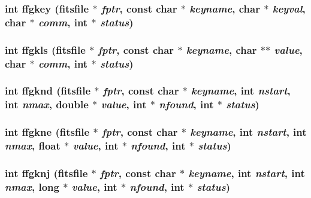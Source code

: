 \subsubsection{\setlength{\rightskip}{0pt plus 5cm}int ffgkey (\bf{fitsfile} $\ast$ {\em fptr}, const char $\ast$ {\em keyname}, char $\ast$ {\em keyval}, char $\ast$ {\em comm}, int $\ast$ {\em status})}\label{fitsio__64_8h_9a92da40129953d96be3d75a06ee8b8a}


\subsubsection{\setlength{\rightskip}{0pt plus 5cm}int ffgkls (\bf{fitsfile} $\ast$ {\em fptr}, const char $\ast$ {\em keyname}, char $\ast$$\ast$ {\em value}, char $\ast$ {\em comm}, int $\ast$ {\em status})}\label{fitsio__64_8h_ffb87d66b7458265f69a1989575b4c0c}


\subsubsection{\setlength{\rightskip}{0pt plus 5cm}int ffgknd (\bf{fitsfile} $\ast$ {\em fptr}, const char $\ast$ {\em keyname}, int {\em nstart}, int {\em nmax}, double $\ast$ {\em value}, int $\ast$ {\em nfound}, int $\ast$ {\em status})}\label{fitsio__64_8h_bd018a9bcb045ffaedb09fd79c311736}


\subsubsection{\setlength{\rightskip}{0pt plus 5cm}int ffgkne (\bf{fitsfile} $\ast$ {\em fptr}, const char $\ast$ {\em keyname}, int {\em nstart}, int {\em nmax}, float $\ast$ {\em value}, int $\ast$ {\em nfound}, int $\ast$ {\em status})}\label{fitsio__64_8h_72336d055c54ad79acde9bbdf96cf8d7}


\subsubsection{\setlength{\rightskip}{0pt plus 5cm}int ffgknj (\bf{fitsfile} $\ast$ {\em fptr}, const char $\ast$ {\em keyname}, int {\em nstart}, int {\em nmax}, long $\ast$ {\em value}, int $\ast$ {\em nfound}, int $\ast$ {\em status})}\label{fitsio__64_8h_7c692a01ca8d3c0f338cebea0bacfb2a}


